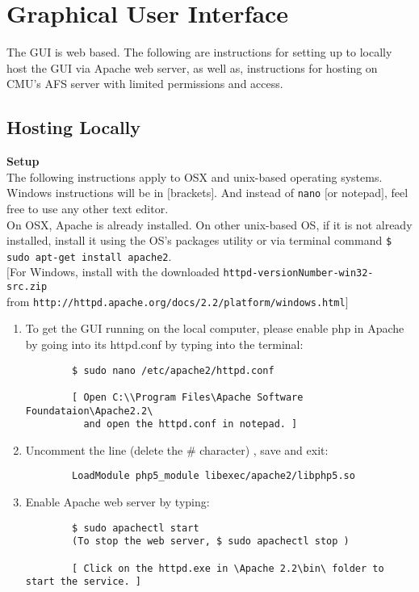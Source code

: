 \documentclass[11pt]{article}
\begin{document}
\section{Graphical User Interface}
The GUI is web based. The following are instructions for setting up to locally host the GUI via Apache web server, as well as, instructions for hosting on CMU's AFS server with limited permissions and access.

\subsection{Hosting Locally}
\textbf{Setup}\\
The following instructions apply to OSX and unix-based operating systems. Windows instructions will be in $[$brackets$]$. And instead of \texttt{nano} $[$or notepad$]$, feel free to use any other text editor.\\
On OSX, Apache is already installed. On other unix-based OS, if it is not already installed, install it using the OS's packages utility or via terminal command \texttt{\$ sudo apt-get install apache2}.\\
$[$For Windows, install with the downloaded \texttt{httpd-versionNumber-win32-src.zip}\\
 from \texttt{http://httpd.apache.org/docs/2.2/platform/windows.html}$]$\\
\begin{enumerate}
	\item To get the GUI running on the local computer, please enable php in Apache by going into its httpd.conf by typing into the terminal:
		\begin{verbatim}
		$ sudo nano /etc/apache2/httpd.conf
		
		[ Open C:\\Program Files\Apache Software Foundataion\Apache2.2\
		  and open the httpd.conf in notepad. ]
		\end{verbatim}
	\item Uncomment the line (delete the \# character) , save and exit:
		\begin{verbatim}
		LoadModule php5_module libexec/apache2/libphp5.so
		\end{verbatim}
	\item Enable Apache web server by typing:
		\begin{verbatim}
		$ sudo apachectl start
		(To stop the web server, $ sudo apachectl stop )
			
		[ Click on the httpd.exe in \Apache 2.2\bin\ folder to start the service. ]
		\end{verbatim}
\end{enumerate}
\bigskip
\end{document}
